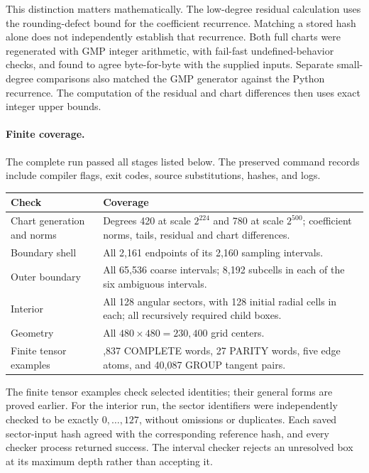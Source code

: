 \documentclass[11pt]{article}
\numberwithin{equation}{section}
\theoremstyle{definition}
\theoremstyle{remark}
\begin{document}
This distinction matters mathematically.  The low-degree residual calculation
uses the rounding-defect bound for the coefficient recurrence.  Matching a
stored hash alone does not independently establish that recurrence.  Both full
charts were regenerated with GMP integer arithmetic, with fail-fast
undefined-behavior checks, and found to agree
byte-for-byte with the supplied inputs.  Separate small-degree comparisons also
matched the GMP generator against the Python recurrence.  The computation of
the residual and chart differences then uses exact integer upper bounds.

\paragraph{Finite coverage.}
The complete run passed all stages listed below.  The preserved command records
include compiler flags, exit codes, source substitutions, hashes, and logs.
\begin{center}
\begin{tabular}{@{}>{\arraybackslash}p{.29\linewidth}>{\arraybackslash}p{.65\linewidth}@{}}
\toprule
Check & Coverage \\
\midrule
Chart generation and norms & Degrees 420 at scale $2^{224}$ and 780 at scale
$2^{500}$; coefficient norms, tails, residual and chart differences. \\
Boundary shell & All 2,161 endpoints of its 2,160 sampling intervals. \\
Outer boundary & All 65,536 coarse intervals; 8,192 subcells in each of the
six ambiguous intervals. \\
Interior & All 128 angular sectors, with 128 initial radial cells in each;
all recursively required child boxes. \\
Geometry & All $480\times480=230{,}400$ grid centers. \\
Finite tensor examples & 9,837 COMPLETE words, 27 PARITY words, five edge
atoms, and 40,087 GROUP tangent pairs. \\
\bottomrule
\end{tabular}
\end{center}
The finite tensor examples check selected identities; their general forms are
proved earlier.  For the interior run, the sector identifiers were independently
checked to be exactly $0,\ldots,127$, without omissions or duplicates.  Each saved
sector-input hash agreed with the corresponding reference hash, and every
checker process returned success.  The interval checker rejects an unresolved
box at its maximum depth rather than accepting it.
\end{document}
